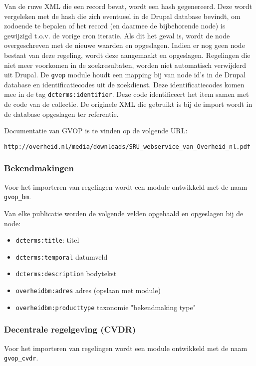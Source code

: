 Van de ruwe XML die een record bevat, wordt een hash gegenereerd. Deze wordt vergeleken met de hash die zich eventueel in de Drupal database bevindt, om zodoende te bepalen of het record (en daarmee de bijbehorende node) is gewijzigd t.o.v. de vorige cron iteratie. Als dit het geval is, wordt de node overgeschreven met de nieuwe waarden en opgeslagen. Indien er nog geen node bestaat van deze regeling, wordt deze aangemaakt en opgeslagen. Regelingen die niet meer voorkomen in de zoekresultaten, worden niet automatisch verwijderd uit Drupal.
De \texttt{gvop} module houdt een mapping bij van node id's in de Drupal database en identificatiecodes uit de zoekdienst. Deze identificatiecodes komen mee in de tag \texttt{dcterms:identifier}. Deze code identificeert het item samen met de code van de collectie.
De originele XML die gebruikt is bij de import wordt in de database opgeslagen ter referentie.

Documentatie van GVOP is te vinden op de volgende URL:
\begin{verbatim}
http://overheid.nl/media/downloads/SRU_webservice_van_Overheid_nl.pdf
\end{verbatim}

\subsubsection{Bekendmakingen}

Voor het importeren van regelingen wordt een module ontwikkeld met de naam \texttt{gvop\_bm}.

Van elke publicatie worden de volgende velden opgehaald en opgeslagen bij de node:

\begin{itemize}
\item \texttt{dcterms:title}: titel
\item \texttt{dcterms:temporal} datumveld
\item \texttt{dcterms:description} bodytekst
\item \texttt{overheidbm:adres} adres (opslaan met  module)
\item \texttt{overheidbm:producttype} taxonomie "bekendmaking type"
\end{itemize}

\subsubsection{Decentrale regelgeving (CVDR)}

Voor het importeren van regelingen wordt een module ontwikkeld met de naam \texttt{gvop\_cvdr}.

